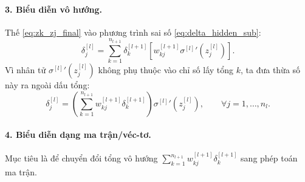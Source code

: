 \paragraph{3. Biểu diễn vô hướng.\\}
Thế \eqref{eq:zk_zj_final} vào phương trình sai số \eqref{eq:delta_hidden_sub}:
\begin{equation}
\delta_j^{[l]} = \sum_{k=1}^{n_{l+1}} \delta_k^{[l+1]} \left[ w_{kj}^{[l+1]} {\sigma^{[l]}}'\!\left(z_j^{[l]}\right) \right].
\end{equation}
Vì nhân tử ${\sigma^{[l]}}'\!\left(z_j^{[l]}\right)$ không phụ thuộc vào chỉ số lấy tổng $k$, ta đưa thừa số này ra ngoài dấu tổng:
\begin{equation}
\delta_j^{[l]} = \left( \sum_{k=1}^{n_{l+1}} w_{kj}^{[l+1]} \delta_k^{[l+1]} \right) {\sigma^{[l]}}'\!\left(z_j^{[l]}\right), \qquad \forall j = 1, \dots, n_l.
\label{eq:bp_second_scalar}
\end{equation}

\paragraph{4. Biểu diễn dạng ma trận/véc-tơ.\\}
Mục tiêu là để chuyển đổi tổng vô hướng $\sum_{k=1}^{n_{l+1}} w_{kj}^{[l+1]} \delta_k^{[l+1]}$ sang phép toán ma trận. 

